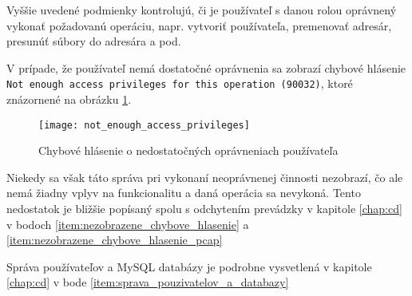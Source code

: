 Vyššie uvedené podmienky kontrolujú, či je používateľ s danou rolou oprávnený vykonať požadovanú operáciu, napr. vytvoriť používateľa, premenovať adresár, presunúť súbory do adresára a pod.

V prípade, že používateľ nemá dostatočné oprávnenia sa zobrazí chybové hlásenie \texttt{Not enough access privileges for this operation (90032)}, ktoré znázornené na obrázku \ref{obr:not_enough_access_privileges}.

\begin{figure}
    \centering
    \texttt{[image: not\_enough\_access\_privileges]}
    \caption{Chybové hlásenie o nedostatočných oprávneniach používateľa}
    \label{obr:not_enough_access_privileges}
\end{figure}

Niekedy sa však táto správa pri vykonaní neoprávnenej činnosti nezobrazí, čo ale nemá žiadny vplyv na funkcionalitu a daná operácia sa nevykoná. Tento nedostatok je bližšie popísaný spolu s odchytením prevádzky v kapitole \ref{chap:cd} v bodoch \ref{item:nezobrazene_chybove_hlasenie} a \ref{item:nezobrazene_chybove_hlasenie_pcap}

Správa používateľov a MySQL databázy je podrobne vysvetlená v kapitole \ref{chap:cd} v bode \ref{item:sprava_pouzivatelov_a_databazy}
